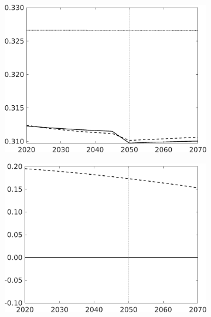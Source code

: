 \begin{figure}[h!!]
\begin{subfigure}[]{0.32\textwidth}
\end{subfigure}	
\begin{subfigure}[]{0.32\textwidth}
\includegraphics[width=1\textwidth]{../../codding_model/own_basedOnFried/optimalPol_010922_revision/figures/all_13Sept22_Tplus30/hl_CompEffOPT_T_NoTaus_regime4_opteff_knspil0_spillover0_noskill0_sep0_xgrowth0_countec0_PV1_etaa0.79_lgd0_lff1.png}
\end{subfigure}		\begin{subfigure}[]{0.32\textwidth}
\includegraphics[width=1\textwidth]{../../codding_model/own_basedOnFried/optimalPol_010922_revision/figures/all_13Sept22_Tplus30/sff_CompEffOPT_T_NoTaus_regime4_opteff_knspil0_spillover0_noskill0_sep0_xgrowth0_countec0_PV1_etaa0.79_lgd0_lff1.png}

\end{subfigure}
\end{figure}
